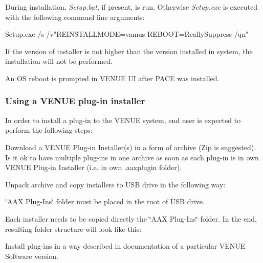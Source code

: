  During installation, {\itshape Setup.\+bat}, if present, is run. Otherwise {\itshape Setup.\+exe} is executed with the following command line arguments\+:

 {\ttfamily Setup.\+exe /s /v"R\+E\+I\+N\+S\+T\+A\+L\+L\+M\+O\+D\+E=vamus R\+E\+B\+O\+O\+T=Really\+Suppress /qn"}

 If the version of installer is not higher than the version installed in system, the installation will not be performed.

 An O\+S reboot is prompted in V\+E\+N\+U\+E U\+I after P\+A\+C\+E was installed.

\hypertarget{a00377_subsection__aax_venue_guide__installer__use}{}\subsubsection{Using a V\+E\+N\+U\+E plug-\/in installer}\label{a00377_subsection__aax_venue_guide__installer__use}
 In order to install a plug-\/in to the V\+E\+N\+U\+E system, end user is expected to perform the following steps\+: 
\begin{DoxyEnumerate}
\item Download a V\+E\+N\+U\+E Plug-\/in Installer(s) in a form of archive (Zip is suggested). Is it ok to have multiple plug-\/ins in one archive as soon as each plug-\/in is in own V\+E\+N\+U\+E Plug-\/in Installer (i.\+e. in own .aaxplugin folder).  
\item Unpack archive and copy installers to U\+S\+B drive in the following way\+: 
\begin{DoxyEnumerate}
\item \char`\"{}\+A\+A\+X Plug-\/\+Ins\char`\"{} folder must be placed in the root of U\+S\+B drive.  
\item Each installer needs to be copied directly the \char`\"{}\+A\+A\+X Plug-\/\+Ins\char`\"{} folder. In the end, resulting folder structure will look like this\+:   
\end{DoxyEnumerate}
\item Install plug-\/ins in a way described in documentation of a particular V\+E\+N\+U\+E Software version.  
\end{DoxyEnumerate}





